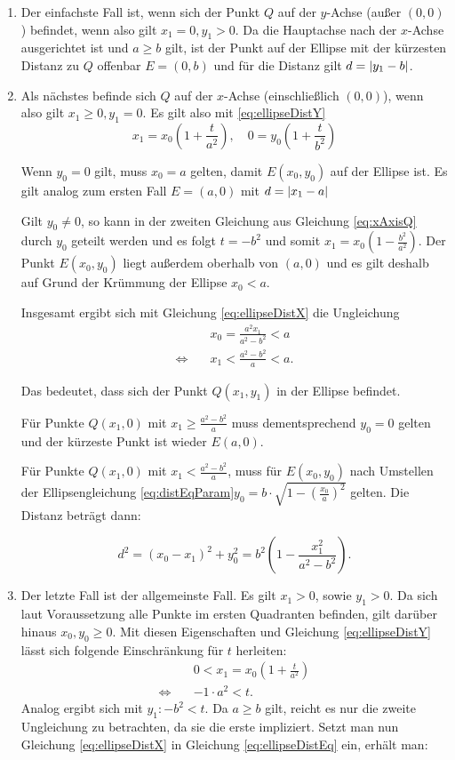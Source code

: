 \begin{enumerate}
	\item Der einfachste Fall ist, wenn sich der Punkt $Q$ auf der $y$-Achse (außer $(0,0)$) befindet, wenn also gilt $x_1 = 0, y_1 > 0$.
	Da die Hauptachse nach der $x$-Achse ausgerichtet ist und $a \geq b$ gilt, ist der Punkt auf der Ellipse mit der kürzesten Distanz zu $Q$ offenbar $E = (0, b)$ und für die Distanz gilt $d = \lvert y_1 - b\rvert$.
	\item Als nächstes befinde sich $Q$ auf der $x$-Achse (einschließlich $(0,0)$), wenn also gilt  $x_1 \geq 0, y_1 = 0$. Es gilt also mit \ref{eq:ellipseDistY}
	\begin{equation} \label{eq:xAxisQ}
		x_1 = x_0\left(1 + \frac{t}{a^2}\right), \quad 0 = y_0\left(1 + \frac{t}{b^2}\right)
	\end{equation}

	Wenn $y_0 = 0$ gilt, muss $x_0 = a$ gelten, damit $E(x_0,y_0)$ auf der Ellipse ist. Es  gilt analog zum ersten Fall $E=(a,0)$ mit $d = \lvert x_1 - a\rvert$

	Gilt $y_0 \neq 0$, so kann in der zweiten Gleichung aus Gleichung \ref{eq:xAxisQ} durch $y_0$ geteilt werden und es folgt $t = -b^2$ und somit $x_1 = x_0\left(1 - \frac{b^2}{a^2}\right)$. Der Punkt $E(x_0,y_0)$ liegt außerdem oberhalb von $(a,0)$ und es gilt deshalb auf Grund der Krümmung der Ellipse $x_0 < a$.

	Insgesamt ergibt sich mit Gleichung \ref{eq:ellipseDistX} die Ungleichung
	\[
	\begin{aligned}
		&x_0 = \frac{a^2x_1}{a^2 - b^2} < a \\
		\Leftrightarrow\quad &x_1 < \frac{a^2 - b^2}{a} < a.
	\end{aligned}
	\]

	Das bedeutet, dass sich der Punkt $Q(x_1,y_1)$ in der Ellipse befindet.

	Für Punkte $Q(x_1,0)$ mit $x_1 \geq \frac{a^2 - b^2}{a}$ muss dementsprechend $y_0 = 0$ gelten und der kürzeste Punkt ist wieder $E(a,0)$.

	Für Punkte $Q(x_1,0)$ mit $x_1 < \frac{a^2 - b^2}{a}$, muss für $E(x_0,y_0)$ nach Umstellen der Ellipsengleichung \ref{eq:distEqParam}\quad$y_0 = b\cdot\sqrt{1-\left(\frac{x_0}{a}\right)^2}$ gelten.
	Die Distanz beträgt dann:

	\[
		d^2 = (x_0 - x_1)^2 + y_0^2 = b^2\left(1 - \frac{x_1^2}{a^2 - b^2}\right).
	\]
	\item Der letzte Fall ist der allgemeinste Fall. Es gilt $x_1 > 0$, sowie $y_1 > 0$. Da sich laut Voraussetzung alle Punkte im ersten Quadranten befinden, gilt darüber hinaus $x_0, y_0 \geq 0$. Mit diesen Eigenschaften und Gleichung \ref{eq:ellipseDistY} lässt sich folgende Einschränkung für $t$ herleiten:
\[
	\begin{aligned}
	& 0 < x_1 = x_0\left(1 + \frac{t}{a^2}\right)\\
	\Leftrightarrow\quad& -1\cdot a^2 < t.
	\end{aligned}
\]
	Analog ergibt sich mit $y_1\colon -b^2 < t$. Da $a\geq b$ gilt, reicht es nur die zweite Ungleichung zu betrachten, da sie die erste impliziert. Setzt man nun Gleichung \ref{eq:ellipseDistX} in Gleichung \ref{eq:ellipseDistEq} ein, erhält man:


\end{enumerate}
